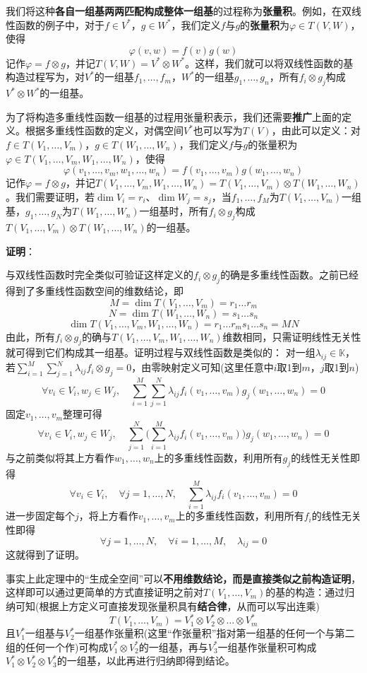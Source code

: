 \documentclass[a4paper,UTF8,fontset=windows,AutoFakeBold]{ctexart}
\newcommand*{\note}{\noindent *}
\newcommand{\proo}[1]{{\vspace{5pt}\kaishu\noindent\textbf{证明}：\vspace{-3pt}
\begin{compactitem}
    \item[] #1
\end{compactitem}
}}
\begin{document}
我们将这种\textbf{各自一组基两两匹配构成整体一组基}的过程称为\textbf{张量积}。例如，在双线性函数的例子中，对于$f\in V^*$，$g\in W^*$，我们定义$f$与$g$的\textbf{张量积}为$\varphi\in T(V,W)$，使得
$$\varphi(v,w)=f(v)g(w)$$
记作$\varphi=f\otimes g$，并记$T(V,W)=V^*\otimes W^*$。这样，我们就可以将双线性函数的基构造过程写为，对$V^*$的一组基$f_1,\dots,f_m$，$W^*$的一组基$g_1,\dots,g_n$，所有$f_i\otimes g_j$构成$V^*\otimes W^*$的一组基。

为了将构造多重线性函数一组基的过程用张量积表示，我们还需要\textbf{推广}上面的定义。根据多重线性函数的定义，对偶空间$V^*$也可以写为$T(V)$，由此可以定义：对$f\in T(V_1,\dots,V_m)$，$g\in T(W_1,\dots,W_n)$，我们定义$f$与$g$的张量积为$\varphi\in T(V_1,\dots,V_m,W_1,\dots,W_n)$，使得
$$\varphi(v_1,\dots,v_m,w_1,\dots,w_n)=f(v_1,\dots,v_m)g(w_1,\dots,w_n)$$
记作$\varphi=f\otimes g$，并记$T(V_1,\dots,V_m,W_1,\dots,W_n)=T(V_1,\dots,V_m)\otimes T(W_1,\dots,W_n)$。我们需要证明，若$\dim V_i=r_i$、$\dim W_j=s_j$，当$f_1,\dots,f_M$为$T(V_1,\dots,V_m)$一组基，$g_1,\dots,g_N$为$T(W_1,\dots,W_n)$一组基时，所有$f_i\otimes g_j$构成$T(V_1,\dots,V_m)\otimes T(W_1,\dots,W_n)$的一组基。

\proo{
    与双线性函数时完全类似可验证这样定义的$f_i\otimes g_j$的确是多重线性函数。之前已经得到了多重线性函数空间的维数结论，即
    $$M=\dim T(V_1,\dots,V_m)=r_1\dots r_m$$
    $$N=\dim T(W_1,\dots,W_n)=s_1\dots s_n$$
    $$\dim T(V_1,\dots,V_m,W_1,\dots,W_n)=r_1\dots r_ms_1\dots s_n=MN$$
    由此，所有$f_i\otimes g_j$的确与$T(V_1,\dots,V_m,W_1,\dots,W_n)$维数相同，只需证明线性无关性就可得到它们构成其一组基。证明过程与双线性函数是类似的：
    对一组$\lambda_{ij}\in\mathbb{K}$，若$\sum_{i=1}^M\sum_{j=1}^N\lambda_{ij}f_i\otimes g_j=0$，由零映射定义可知(这里任意中$i$取1到$m$，$j$取1到$n$)
    $$\forall v_i\in V_i,w_j\in W_j,\quad\sum_{i=1}^M\sum_{j=1}^N\lambda_{ij}f_i(v_1,\dots,v_m)g_j(w_1,\dots,w_n)=0$$
    固定$v_1,\dots,v_m$整理可得
    $$\forall v_i\in V_i,w_j\in W_j,\quad\sum_{j=1}^N\bigg(\sum_{i=1}^M\lambda_{ij}f_i(v_1,\dots,v_m)\bigg)g_j(w_1,\dots,w_n)=0$$
    与之前类似将其上方看作$w_1,\dots,w_n$上的多重线性函数，利用所有$g_j$的线性无关性即得
    $$\forall v_i\in V_i,\quad\forall j=1,\dots,N,\quad\sum_{i=1}^M\lambda_{ij}f_i(v_1,\dots,v_m)=0$$
    进一步固定每个$j$，将上方看作$v_1,\dots,v_m$上的多重线性函数，利用所有$f_i$的线性无关性即得
    $$\forall j=1,\dots,N,\quad\forall i=1,\dots,M,\quad\lambda_{ij}=0$$
    这就得到了证明。
}

\note 事实上此定理中的``生成全空间''可以\textbf{不用维数结论，而是直接类似之前构造证明}，这样即可以通过更简单的方式直接证明之前对$T(V_1,\dots,V_m)$的基的构造：通过归纳可知(根据上方定义可直接发现张量积具有\textbf{结合律}，从而可以写出连乘)
$$T(V_1,\dots,V_m)=V_1^*\otimes V_2^*\otimes\dots\otimes V_m^*$$
且$V_1^*$一组基与$V_2^*$一组基作张量积(这里``作张量积''指对第一组基的任何一个与第二组的任何一个作)可构成$V_1^*\otimes V_2^*$的一组基，再与$V_3^*$一组基作张量积可构成$V_1^*\otimes V_2^*\otimes V_3^*$的一组基，以此再进行归纳即得到结论。
\end{document}
